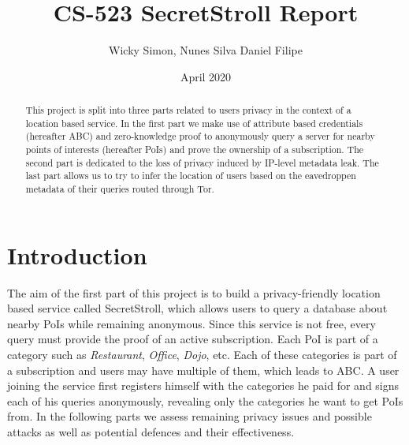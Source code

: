 \documentclass[10pt,conference,compsocconf]{IEEEtran}
\title{CS-523 SecretStroll Report}
\author{Wicky Simon, Nunes Silva Daniel Filipe}
\date{April 2020}
\begin{document}
\maketitle

\begin{abstract}
  This project is split into three parts related to users privacy in the context of a location based service.
  In the first part we make use of attribute based credentials (hereafter ABC) and zero-knowledge proof to anonymously query a server for nearby points of interests (hereafter PoIs) and prove the ownership of a subscription. The second part is dedicated to the loss of privacy induced by IP-level metadata leak. The last part allows us to try to infer the location of users based on the eavedroppen metadata of their queries routed through Tor.
\end{abstract}

\section{Introduction}

The aim of the first part of this project is to build a privacy-friendly location based service called SecretStroll, which allows users to query a database about nearby PoIs while remaining anonymous. Since this service is not free, every query must provide the proof of an active subscription. Each PoI is part of a category such as \textit{Restaurant}, \textit{Office}, \textit{Dojo}, etc. Each of these categories is part of a subscription and users may have multiple of them, which leads to ABC. A user joining the service first registers himself with the categories he paid for and signs each of his queries anonymously, revealing only the categories he want to get PoIs from. In the following parts we assess remaining privacy issues and possible attacks as well as potential defences and their effectiveness.
\end{document}
